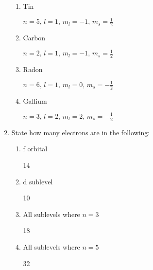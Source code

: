 \documentclass[12pt]{article}
\begin{document}
\begin{enumerate}
\begin{enumerate}
      \item Tin

        \begin{center}
          $n=5,\, l=1,\, m_l=-1,\, m_s=\frac{1}{2}$
        \end{center}

      \item Carbon

        \begin{center}
          $n=2,\, l=1,\, m_l=-1,\, m_s=\frac{1}{2}$
        \end{center}

      \item Radon

        \begin{center}
          $n=6,\, l=1,\, m_l=0,\, m_s=-\frac{1}{2}$
        \end{center}

      \item Gallium

        \begin{center}
          $n=3,\, l=2,\, m_l=2,\, m_s=-\frac{1}{2}$
        \end{center}

    \end{enumerate}

  \item State how many electrons are in the following:

    \begin{enumerate}

      \item f orbital

        \begin{center}
          14
        \end{center}

      \item d sublevel

        \begin{center}
          10
        \end{center}

      \item All sublevels where $n=3$

        \begin{center}
          18
        \end{center}

      \item All sublevels where $n=5$

        \begin{center}
          32
        \end{center}


\end{enumerate}
\end{enumerate}
\end{document}
